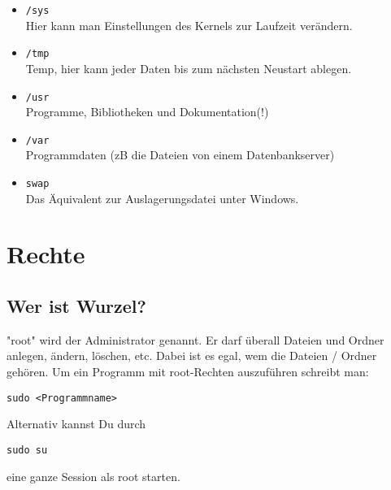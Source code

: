 \documentclass[a4paper,10pt]{article}
\newcommand{\befehl}[1]{
  \begin{center}
    \texttt{#1}
  \end{center}
}
\begin{document}
\begin{itemize}
      \item \texttt{/sys} \\ Hier kann man Einstellungen des Kernels zur Laufzeit verändern.
      \item \texttt{/tmp} \\ Temp, hier kann jeder Daten bis zum nächsten Neustart ablegen.
      \item \texttt{/usr} \\ Programme, Bibliotheken und Dokumentation(!)
      \item \texttt{/var} \\ Programmdaten (zB die Dateien von einem Datenbankserver)
      \item \texttt{swap} \\Das Äquivalent zur Auslagerungsdatei unter Windows.
    \end{itemize}


  \section{ Rechte}
    \subsection{Wer ist Wurzel?}
      "root" wird der Administrator genannt. Er darf überall Dateien und Ordner anlegen, ändern, löschen, etc. Dabei ist es egal, wem die Dateien / Ordner gehören. Um ein Programm mit root-Rechten auszuführen schreibt man:
      \befehl{sudo <Programmname>}
      Alternativ kannst Du durch
      \befehl{sudo su}
      eine ganze Session als root starten.
\end{document}
